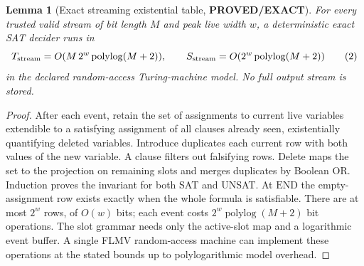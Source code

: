 \documentclass[11pt]{article}
\newtheorem{lemma}{Lemma}
\newcommand{\EXACT}{\textbf{PROVED/EXACT}}
\begin{document}
\begin{lemma}[Exact streaming existential table, \EXACT]
For every trusted valid stream of bit length $M$ and peak live width $w$, a deterministic exact SAT decider runs in
\[
 T_{\rm stream}=O(M\,2^w\operatorname{polylog}(M+2)),\qquad
 S_{\rm stream}=O(2^w\operatorname{polylog}(M+2))
 \tag{2}
\]
in the declared random-access Turing-machine model. No full output stream is stored.
\end{lemma}
\begin{proof}
After each event, retain the set of assignments to current live variables extendible to a satisfying assignment of all clauses already seen, existentially quantifying deleted variables. Introduce duplicates each current row with both values of the new variable. A clause filters out falsifying rows. Delete maps the set to the projection on remaining slots and merges duplicates by Boolean OR. Induction proves the invariant for both SAT and UNSAT. At $\mathrm{END}$ the empty-assignment row exists exactly when the whole formula is satisfiable. There are at most $2^w$ rows, of $O(w)$ bits; each event costs $2^w\operatorname{polylog}(M+2)$ bit operations. The slot grammar needs only the active-slot map and a logarithmic event buffer. A single FLMV random-access machine can implement these operations at the stated bounds up to polylogarithmic model overhead.
\end{proof}
\end{document}
